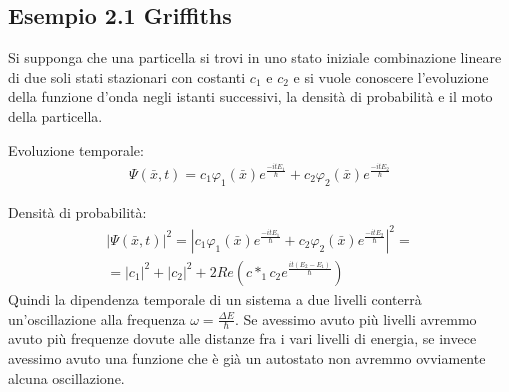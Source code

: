 \subsection{Esempio 2.1 Griffiths} %
Si supponga che una particella si trovi in uno stato iniziale combinazione lineare di due soli stati stazionari con costanti $c_1$ e $c_2$ e si vuole conoscere l'evoluzione della funzione d'onda negli istanti successivi, la densità di probabilità e il moto della particella.

Evoluzione temporale:
\begin{equation}\begin{split}
\Psi\left(\bar x,t\right)=c_1 \varphi_1 \left(\bar x\right)e^{\frac{-itE_1}{\hbar}}+c_2 \varphi_2 \left(\bar x\right)e^{\frac{-itE_2}{\hbar}}
\end{split}\end{equation}

Densità di probabilità:
\begin{equation}\begin{split}
|\Psi\left(\bar x,t\right)|^2=|c_1 \varphi_1 \left(\bar x\right)e^{\frac{-itE_1}{\hbar}}+c_2 \varphi_2 \left(\bar x\right)e^{\frac{-itE_2}{\hbar}}|^2=\\
=|c_1|^2 + |c_2|^2 +2Re\left(c*_1 c_2 e^{\frac{it\left(E_2 -E_1\right)}{\hbar}}\right)
\end{split}\end{equation}
Quindi la dipendenza temporale di un sistema a due livelli conterrà un'oscillazione alla frequenza $\omega=\frac{\Delta E}{\hbar}$. Se avessimo avuto più livelli avremmo avuto più frequenze dovute alle distanze fra i vari livelli di energia, se invece avessimo avuto una funzione che è già un autostato non avremmo ovviamente alcuna oscillazione.

